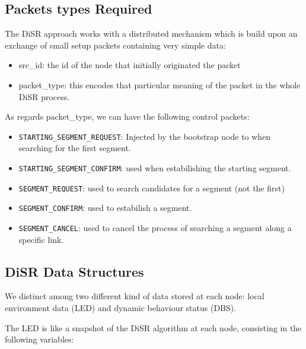 \subsection{Packets types Required}

The DiSR approach works with a distributed mechanism which is build
upon an exchange of small setup packets containing very simple data:
\begin{itemize}
\item{src\_id}: the id of the node that initially originated the
packet
\item{packet\_type}: this encodes that particular meaning of the
packet in the whole DiSR process.
\end{itemize}

As regards packet\_type, we can have the following control packets:
\begin{itemize}
\item{\texttt{STARTING\_SEGMENT\_REQUEST}}: Injected by the bootstrap
node to when searching for the first segment. 
\item{\texttt{STARTING\_SEGMENT\_CONFIRM}}: used when estabilishing
the starting  segment. 
\item{\texttt{SEGMENT\_REQUEST}}: used to search candidates for a segment (not the
first)
\item{\texttt{SEGMENT\_CONFIRM}}: used to estabilish a segment. 
\item{\texttt{SEGMENT\_CANCEL}}: used to cancel the process of searching a segment along a
specific link.
\end{itemize}

\subsection{DiSR Data Structures}

We distinct among two different kind of data stored at each node:
local environment data (LED) and dynamic behaviour status (DBS).

The LED is like a snapshot of the DiSR algorithm at each node,
consisting in the following variables:

